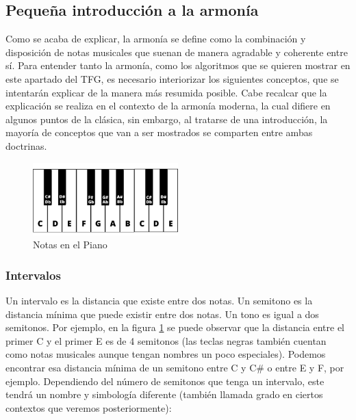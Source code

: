     \subsection{Pequeña introducción a la armonía}

        Como se acaba de explicar, la armonía se define como la combinación y disposición de notas musicales que suenan de manera agradable y coherente entre sí. Para entender tanto la armonía, como los algoritmos que se quieren mostrar en este apartado del TFG, es necesario interiorizar los siguientes conceptos, que se intentarán explicar de la manera más resumida posible. Cabe recalcar que la explicación se realiza en el contexto de la armonía moderna, la cual difiere en algunos puntos de la clásica, sin embargo, al tratarse de una introducción, la mayoría de conceptos que van a ser mostrados se comparten entre ambas doctrinas. 

\begin{figure}[h]
    \centering
    \includegraphics[width = 0.5\textwidth]{Imagenes/Bitmap/piano.png}
    \caption{Notas en el Piano}
    \label{fig:pianoImage}
\end{figure}

        \subsubsection{Intervalos}\label{sec:arm:intervalos}

        Un intervalo es la distancia que existe entre dos notas. Un semitono es la distancia mínima que puede existir entre dos notas. Un tono es igual a dos semitonos. Por ejemplo, en la figura \ref{fig:pianoImage} se puede observar que la distancia entre el primer C y el primer E es de 4 semitonos (las teclas negras también cuentan como notas musicales aunque tengan nombres un poco especiales). Podemos encontrar esa distancia mínima de un semitono entre C y C\# o entre E y F, por ejemplo. Dependiendo del número de semitonos que tenga un intervalo, este tendrá un nombre y simbología diferente (también llamada grado en ciertos contextos que veremos posteriormente):

